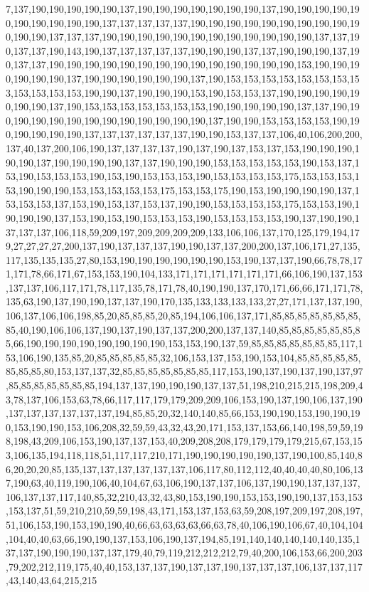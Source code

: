 7,137,190,190,190,190,190,137,190,190,190,190,190,190,190,137,190,190,190,190,190,190,190,190,190,190,137,137,137,137,137,190,190,190,190,190,190,190,190,190,190,190,190,137,137,137,190,190,190,190,190,190,190,190,190,190,190,190,137,137,190,137,137,190,143,190,137,137,137,137,137,190,190,190,137,137,190,190,190,137,190,137,137,190,190,190,190,190,190,190,190,190,190,190,190,190,190,153,190,190,190,190,190,190,137,190,190,190,190,190,190,137,190,153,153,153,153,153,153,153,153,153,153,153,153,190,190,137,190,190,190,153,190,153,153,137,190,190,190,190,190,190,190,137,190,153,153,153,153,153,153,153,190,190,190,190,190,137,137,190,190,190,190,190,190,190,190,190,190,190,190,190,137,190,190,153,153,153,153,190,190,190,190,190,190,137,137,137,137,137,137,190,190,153,137,137,106,40,106,200,200,137,40,137,200,106,190,137,137,137,137,190,137,190,137,153,137,153,190,190,190,190,190,137,190,190,190,190,137,137,190,190,190,153,153,153,153,153,190,153,137,153,190,153,153,153,190,153,190,153,153,153,190,153,153,153,153,175,153,153,153,153,190,190,190,153,153,153,153,153,175,153,153,175,190,153,190,190,190,190,137,153,153,153,137,153,190,153,137,153,137,190,190,153,153,153,153,175,153,153,190,190,190,190,137,153,190,153,190,153,153,153,190,153,153,153,153,190,137,190,190,137,137,137,106,118,59,209,197,209,209,209,209,133,106,106,137,170,125,179,194,179,27,27,27,27,200,137,190,137,137,137,190,190,137,137,200,200,137,106,171,27,135,117,135,135,135,27,80,153,190,190,190,190,190,190,153,190,137,137,190,66,78,78,171,171,78,66,171,67,153,153,190,104,133,171,171,171,171,171,171,66,106,190,137,153,137,137,106,117,171,78,117,135,78,171,78,40,190,190,137,170,171,66,66,171,171,78,135,63,190,137,190,190,137,137,190,170,135,133,133,133,133,27,27,171,137,137,190,106,137,106,106,198,85,20,85,85,85,20,85,194,106,106,137,171,85,85,85,85,85,85,85,85,40,190,106,106,137,190,137,190,137,137,200,200,137,137,140,85,85,85,85,85,85,85,66,190,190,190,190,190,190,190,190,153,153,190,137,59,85,85,85,85,85,85,85,117,153,106,190,135,85,20,85,85,85,85,85,32,106,153,137,153,190,153,104,85,85,85,85,85,85,85,85,80,153,137,137,32,85,85,85,85,85,85,85,117,153,190,137,190,137,190,137,97,85,85,85,85,85,85,85,194,137,137,190,190,190,137,137,51,198,210,215,215,198,209,43,78,137,106,153,63,78,66,117,117,179,179,209,209,106,153,190,137,190,106,137,190,137,137,137,137,137,137,194,85,85,20,32,140,140,85,66,153,190,190,153,190,190,190,153,190,190,153,106,208,32,59,59,43,32,43,20,171,153,137,153,66,140,198,59,59,198,198,43,209,106,153,190,137,137,153,40,209,208,208,179,179,179,179,215,67,153,153,106,135,194,118,118,51,117,117,210,171,190,190,190,190,190,137,190,100,85,140,86,20,20,20,85,135,137,137,137,137,137,137,106,117,80,112,112,40,40,40,40,80,106,137,190,63,40,119,190,106,40,104,67,63,106,190,137,137,106,137,190,190,137,137,137,106,137,137,117,140,85,32,210,43,32,43,80,153,190,190,153,153,190,190,137,153,153,153,137,51,59,210,210,59,59,198,43,171,153,137,153,63,59,208,197,209,197,208,197,51,106,153,190,153,190,190,40,66,63,63,63,63,66,63,78,40,106,190,106,67,40,104,104,104,40,40,63,66,190,190,137,153,106,190,137,194,85,191,140,140,140,140,140,135,137,137,190,190,190,137,137,179,40,79,119,212,212,212,79,40,200,106,153,66,200,203,79,202,212,119,175,40,40,153,137,137,190,137,137,190,137,137,137,106,137,137,117,43,140,43,64,215,215
